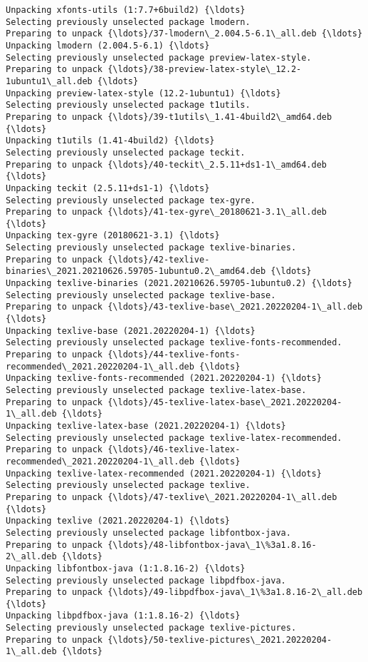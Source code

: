 \documentclass[11pt]{article}
\begin{document}
\begin{Verbatim}[commandchars=\\\{\}]
Unpacking xfonts-utils (1:7.7+6build2) {\ldots}
Selecting previously unselected package lmodern.
Preparing to unpack {\ldots}/37-lmodern\_2.004.5-6.1\_all.deb {\ldots}
Unpacking lmodern (2.004.5-6.1) {\ldots}
Selecting previously unselected package preview-latex-style.
Preparing to unpack {\ldots}/38-preview-latex-style\_12.2-1ubuntu1\_all.deb {\ldots}
Unpacking preview-latex-style (12.2-1ubuntu1) {\ldots}
Selecting previously unselected package t1utils.
Preparing to unpack {\ldots}/39-t1utils\_1.41-4build2\_amd64.deb {\ldots}
Unpacking t1utils (1.41-4build2) {\ldots}
Selecting previously unselected package teckit.
Preparing to unpack {\ldots}/40-teckit\_2.5.11+ds1-1\_amd64.deb {\ldots}
Unpacking teckit (2.5.11+ds1-1) {\ldots}
Selecting previously unselected package tex-gyre.
Preparing to unpack {\ldots}/41-tex-gyre\_20180621-3.1\_all.deb {\ldots}
Unpacking tex-gyre (20180621-3.1) {\ldots}
Selecting previously unselected package texlive-binaries.
Preparing to unpack {\ldots}/42-texlive-
binaries\_2021.20210626.59705-1ubuntu0.2\_amd64.deb {\ldots}
Unpacking texlive-binaries (2021.20210626.59705-1ubuntu0.2) {\ldots}
Selecting previously unselected package texlive-base.
Preparing to unpack {\ldots}/43-texlive-base\_2021.20220204-1\_all.deb {\ldots}
Unpacking texlive-base (2021.20220204-1) {\ldots}
Selecting previously unselected package texlive-fonts-recommended.
Preparing to unpack {\ldots}/44-texlive-fonts-recommended\_2021.20220204-1\_all.deb {\ldots}
Unpacking texlive-fonts-recommended (2021.20220204-1) {\ldots}
Selecting previously unselected package texlive-latex-base.
Preparing to unpack {\ldots}/45-texlive-latex-base\_2021.20220204-1\_all.deb {\ldots}
Unpacking texlive-latex-base (2021.20220204-1) {\ldots}
Selecting previously unselected package texlive-latex-recommended.
Preparing to unpack {\ldots}/46-texlive-latex-recommended\_2021.20220204-1\_all.deb {\ldots}
Unpacking texlive-latex-recommended (2021.20220204-1) {\ldots}
Selecting previously unselected package texlive.
Preparing to unpack {\ldots}/47-texlive\_2021.20220204-1\_all.deb {\ldots}
Unpacking texlive (2021.20220204-1) {\ldots}
Selecting previously unselected package libfontbox-java.
Preparing to unpack {\ldots}/48-libfontbox-java\_1\%3a1.8.16-2\_all.deb {\ldots}
Unpacking libfontbox-java (1:1.8.16-2) {\ldots}
Selecting previously unselected package libpdfbox-java.
Preparing to unpack {\ldots}/49-libpdfbox-java\_1\%3a1.8.16-2\_all.deb {\ldots}
Unpacking libpdfbox-java (1:1.8.16-2) {\ldots}
Selecting previously unselected package texlive-pictures.
Preparing to unpack {\ldots}/50-texlive-pictures\_2021.20220204-1\_all.deb {\ldots}

\end{Verbatim}
\end{document}
